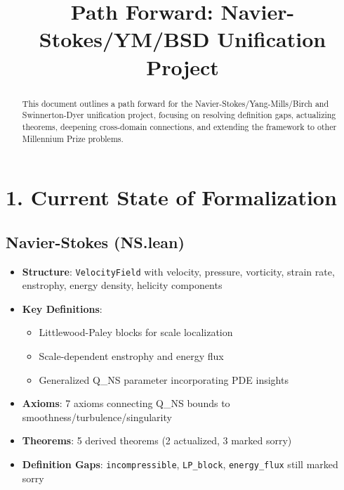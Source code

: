 \documentclass[11pt]{article}
\title{Path Forward: Navier-Stokes/YM/BSD Unification Project}
\author{}
\date{}
\begin{document}
\maketitle
\begin{abstract}
This document outlines a path forward for the Navier-Stokes/Yang-Mills/Birch and Swinnerton-Dyer unification project, focusing on resolving definition gaps, actualizing theorems, deepening cross-domain connections, and extending the framework to other Millennium Prize problems.
\end{abstract}

\section{1. Current State of Formalization}

\subsection{Navier-Stokes (NS.lean)}
\begin{itemize}
\item \textbf{Structure}: \texttt{VelocityField} with velocity, pressure, vorticity, strain rate, enstrophy, energy density, helicity components
\item \textbf{Key Definitions}:
  \begin{itemize}
  \item Littlewood-Paley blocks for scale localization
  \item Scale-dependent enstrophy and energy flux
  \item Generalized Q\_NS parameter incorporating PDE insights
  \end{itemize}
\item \textbf{Axioms}: 7 axioms connecting Q\_NS bounds to smoothness/turbulence/singularity
\item \textbf{Theorems}: 5 derived theorems (2 actualized, 3 marked sorry)
\item \textbf{Definition Gaps}: \texttt{incompressible}, \texttt{LP\_block}, \texttt{energy\_flux} still marked sorry
\end{itemize}
\end{document}

